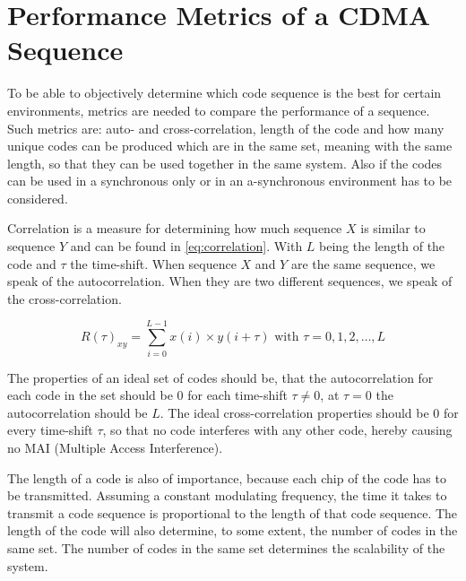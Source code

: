 
\section{Performance Metrics of a CDMA Sequence}
\label{sec:performance-metrics-cdma}

To be able to objectively determine which code sequence is the best for certain environments, metrics are needed to compare the performance of a sequence.
Such metrics are: auto- and cross-correlation, length of the code and how many unique codes can be produced which are in the same set, meaning with the same length, so that they can be used together in the same system.
Also if the codes can be used in a synchronous only or in an a-synchronous environment has to be considered.


Correlation is a measure for determining how much sequence $X$ is similar to sequence $Y$ and can be found in \autoref{eq:correlation}.
With $L$ being the length of the code and $\tau$ the time-shift.
When sequence $X$ and $Y$ are the same sequence, we speak of the autocorrelation.
When they are two different sequences, we speak of the cross-correlation. 

\begin{equation}
	R(\tau)_{xy} = \displaystyle\sum_{i = 0} ^ {L - 1} x(i) \times y(i + \tau) {\text{  with $\tau = 0, 1, 2, \dotsc, L$}}
	\label{eq:correlation}
\end{equation}








The properties of an ideal set of codes should be, that the autocorrelation for each code in the set should be $0$ for each time-shift $\tau \neq 0$, at $\tau = 0$ the autocorrelation should be $L$.
The ideal cross-correlation properties should be $0$ for every time-shift $\tau$, so that no code interferes with any other code, hereby causing no MAI (Multiple Access Interference).



The length of a code is also of importance, because each chip of the code has to be transmitted.
Assuming a constant modulating frequency, the time it takes to transmit a code sequence is proportional to the length of that code sequence.
The length of the code will also determine, to some extent, the number of codes in the same set.
The number of codes in the same set determines the scalability of the system.




